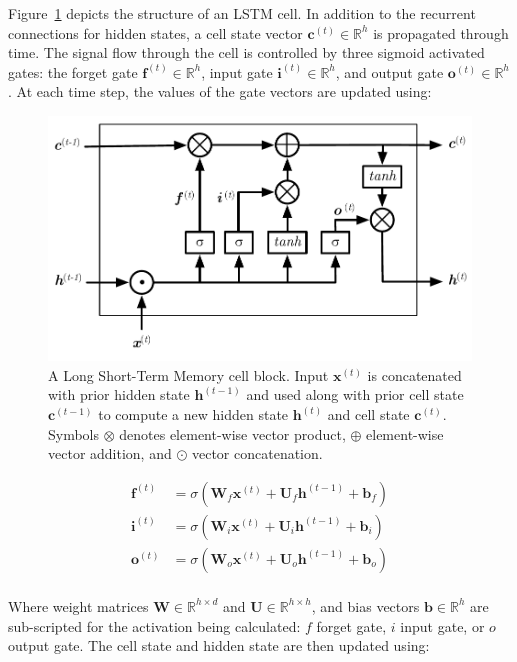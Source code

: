 Figure~\ref{fig:lstm-block} depicts the structure of an LSTM cell. In addition to the recurrent connections for hidden states, a cell state vector $\bm{c}^{(t)} \in \mathbb{R}^h$ is propagated through time. The signal flow through the cell is controlled by three sigmoid activated gates: the forget gate $\bm{f}^{(t)} \in \mathbb{R}^h$, input gate $\bm{i}^{(t)} \in \mathbb{R}^h$, and output gate $\bm{o}^{(t)} \in \mathbb{R}^h$. At each time step, the values of the gate vectors are updated using:

\begin{figure}
  \centering
  \includegraphics[width=.8\columnwidth]{img/lstm-block}%
  \caption[Long Short-Term Memory cell architecture]{%
    A Long Short-Term Memory cell block. Input $\bm{x}^{(t)}$ is concatenated with prior hidden state $\bm{h}^{(t-1)}$ and used along with prior cell state $\bm{c}^{(t-1)}$ to compute a new hidden state $\bm{h}^{(t)}$ and cell state $\bm{c}^{(t)}$. Symbols $\otimes$ denotes element-wise vector product, $\oplus$ element-wise vector addition, and $\odot$ vector concatenation.%
  }%
  \label{fig:lstm-block}
\end{figure}

\begin{align}
  \bm{f}^{(t)} &= \sigma \left( \bm{W}_f \bm{x}^{(t)} + \bm{U}_f \bm{h}^{(t-1)} + \bm{b}_f \right) \\
  \bm{i}^{(t)} &= \sigma \left( \bm{W}_i \bm{x}^{(t)} + \bm{U}_i \bm{h}^{(t-1)} + \bm{b}_i \right) \\
  \bm{o}^{(t)} &= \sigma \left( \bm{W}_o \bm{x}^{(t)} + \bm{U}_o \bm{h}^{(t-1)} + \bm{b}_o \right) \\
\end{align}

Where weight matrices $\bm{W} \in \mathbb{R}^{h\times d}$ and $\bm{U} \in \mathbb{R}^{h\times h}$, and bias vectors $\bm{b} \in \mathbb{R}^h$ are sub-scripted for the activation being calculated: $f$ forget gate, $i$ input gate, or $o$ output gate. The cell state and hidden state are then updated using:

